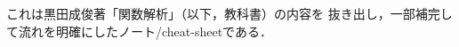 \documentclass[a4j]{jsarticle}
\begin{document}
    これは黒田成俊著「関数解析」（以下，教科書）の内容を
    抜き出し，一部補完して流れを明確にしたノート/cheat-sheetである．

    
    
\end{document}
